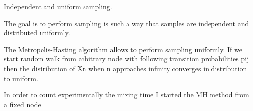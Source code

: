 \documentclass[12pt]{report}
\begin{document}
Independent and uniform sampling.

The goal is to perform sampling is such a way that samples are independent and distributed uniformly.

The Metropolis-Hasting algorithm allows to perform sampling uniformly. If we start random walk from arbitrary node with following transition probabilities pij then the distribution of Xn when n approaches infinity converges in distribution to uniform.
 
In order to count experimentally the mixing time I started the MH method from a fixed node 
\end{document}
